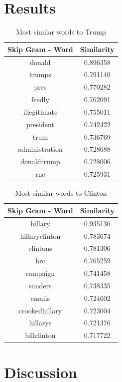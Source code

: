 \documentclass[12pt, authoryear]{elsarticle}
\begin{document}
\section{Results}


\begin{center}
\begin{table}[H]
\begin{tabular}{ c c }
Skip Gram - Word   &  Similarity \\
 \hline
donald   &  0.896358\\
trumps   &  0.791140\\
pres   &  0.770282\\
feedly   &  0.762091\\
illegitimate  &   0.755011\\
president   &  0.742422\\
trum   &  0.736769\\
administration  &   0.728688\\
donaldtrump   &  0.728006\\
rnc   &  0.725931\\
 \hline
\end{tabular}
\caption{Most similar words to Trump}
\label{table:5}
\end{table}
\end{center}


\begin{center}
\begin{table}[H]
\begin{tabular}{ c c }
Skip Gram - Word   &  Similarity \\
 \hline
hillary   &  0.935136\\
hillaryclinton   &  0.783674\\
clintons &    0.781306\\
hrc   &  0.765259\\
campaign  &   0.741458\\
sanders  &  0.738335\\
emails   &  0.724602\\
crookedhillary    & 0.723004\\
hillarys   &  0.721376\\
billclinton  &   0.717722\\
 \hline
\end{tabular}
\caption{Most similar words to Clinton}
\label{table:6}
\end{table}
\end{center}

\section{Discussion}
\end{document}
